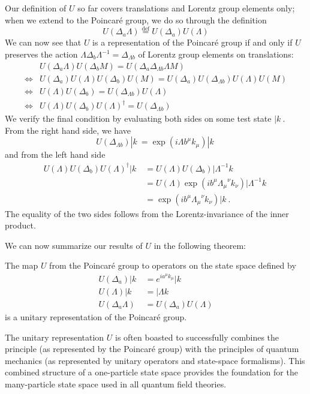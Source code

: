 Our definition of $U$ so far covers translations and Lorentz
group elements only; when we extend to the Poincar\'e group, we
do so through the definition
\begin{equation}%
U(\Delta_{a}\Lambda) \stackrel{\text{def}}{=} U(\Delta_{a})U(\Lambda)
\end{equation}
We can now see that $U$ is a representation of the Poincar\'e
group if and only if $U$ preserves the action
$\Lambda\Delta_{b}\Lambda^{-1}=\Delta_{\Lambda b}$ of Lorentz
group elements on translations:
\begin{subequations}
\begin{align}
 & U(\Delta_{a}\Lambda)U(\Delta_{b}M) =
  U(\Delta_{a}\Delta_{\Lambda b}\Lambda M) \\
\iff & U(\Delta_{a})U(\Lambda)U(\Delta_{b})U(M) =
U(\Delta_{a})U(\Delta_{\Lambda b})U(\Lambda)U(M)\\
\iff & U(\Lambda)U(\Delta_{b}) = U(\Delta_{\Lambda b})U(\Lambda)\\
\iff & U(\Lambda)U(\Delta_{b})U(\Lambda)^{\dag} = U(\Delta_{\Lambda b})
\end{align}
\end{subequations}
We verify the final condition by evaluating both sides on some
test state $|k\>$. From the right hand side, we have
\begin{equation}%
U(\Delta_{\Lambda b})|k\> = \exp(i\Lambda b^{\mu}k_{\mu})|k\>
\end{equation}
and from the left hand side
\begin{subequations}
\begin{align}
U(\Lambda)U(\Delta_{b})U(\Lambda)^{\dag}|k\> &=
U(\Lambda)U(\Delta_{b})|\Lambda^{-1}k\>\\
&=
U(\Lambda)\exp(ib^{\mu}{\Lambda_{\mu}}^{\nu}k_{\nu})|\Lambda^{-1} k\>\\
&=\exp(ib^{\mu}{\Lambda_{\mu}}^{\nu}k_{\nu})|k\>.
\end{align}
\end{subequations}
The equality of the two sides follows from the Lorentz-invariance
of the inner product.

We can now summarize our results of $U$ in the following theorem:
\begin{thm}%
The map $U$ from the Poincar\'e group to operators on the state
space defined by
\begin{subequations}
\begin{align}
U(\Delta_{a})|k\> &= e^{ia^{\mu}k_{\mu}}|k\>\\
U(\Lambda)|k\> &= |\Lambda k\>\\
U(\Delta_{a}\Lambda) &= U(\Delta_{a})U(\Lambda) 
\end{align}
\end{subequations}
is a unitary representation of the Poincar\'e group.
\end{thm}

The unitary representation $U$ is often boasted to successfully
combines the principle (as represented by the Poincar\'e group)
with the principles of quantum mechanics (as represented by
unitary operators and state-space formalisms). This combined
structure of a one-particle state space provides the foundation
for the many-particle state space used in all quantum field theories.
